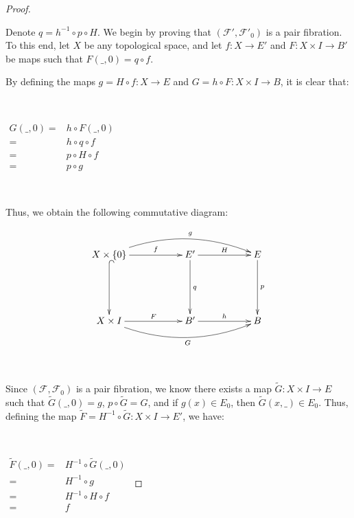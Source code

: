 \documentclass[12pt,oneside]{book}
\newcommand{\wt}{\widetilde}
\begin{document}
    \begin{proof}

        \

        Denote $q = h^{-1} \circ p \circ H$. We begin by proving that $(\mathcal{F'}, \mathcal{F'}_{0})$ is a pair fibration. To this end, 
        let $X$ be any topological space, and let $f: X \to E'$ and $F: X \times I \to B'$ be maps such that $F(\_,0) = q \circ f$.
            
        By defining the maps $g = H \circ f: X \to E$ and $G = h \circ F: X \times I \to B$, it is clear that:

        \
            
            $\begin{array}{rl}
            G(\_,0) = & h \circ F(\_,0) \\
            = & h \circ q \circ f \\
            = & p \circ H \circ f \\
            = & p \circ g
            \end{array}$
        
        \
            
        Thus, we obtain the following commutative diagram:
            
            $$
            \xymatrix @C=0.5cm {
            X \times \{ 0 \} \ar[rrr]^-{f} \ar@{^(->}[dd] \ar@/^0.6cm/[rrrrrr]^-{g} &&& E' \ar[rrr]^-{H} \ar[dd]^{q} &&& E \ar[dd]^-{p} \\
            &&& &&& \\
            X \times I \ar[rrr]^-{F} \ar@/_0.6cm/[rrrrrr]_-{G} &&& B' \ar[rrr]^-{h} &&& B
            }
            $$
        
        \
            
        Since $(\mathcal{F}, \mathcal{F}_{0})$ is a pair fibration, we know there exists a map $\wt{G}: X \times I \to E$ such that 
        $\wt{G}(\_,0) = g$, $p \circ \wt{G} = G$, and if $g(x) \in E_{0}$, then $\wt{G}(x,\_) \in E_{0}$. Thus, defining the map 
        $\wt{F} = H^{-1} \circ \wt{G}: X \times I \to E'$, we have:

        \
            
            $\begin{array}{rl}
                \wt{F}(\_,0) = & H^{-1} \circ \wt{G}(\_,0) \\
                = & H^{-1} \circ g \\
                = & H^{-1} \circ H \circ f \\
                = & f
            \end{array}$
        

\end{proof}
\end{document}
